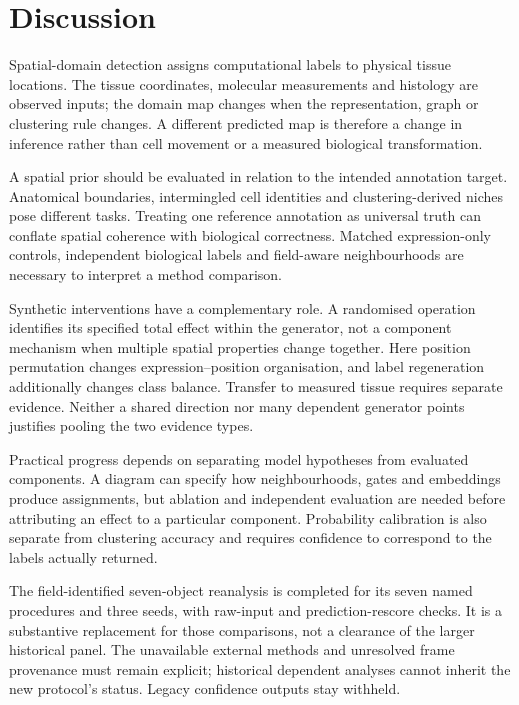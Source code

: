 \documentclass[11pt]{article}
\begin{document}
\section{Discussion}
Spatial-domain detection assigns computational labels to physical tissue locations. The tissue coordinates, molecular measurements and histology are observed inputs; the domain map changes when the representation, graph or clustering rule changes. A different predicted map is therefore a change in inference rather than cell movement or a measured biological transformation.

A spatial prior should be evaluated in relation to the intended annotation target. Anatomical boundaries, intermingled cell identities and clustering-derived niches pose different tasks. Treating one reference annotation as universal truth can conflate spatial coherence with biological correctness. Matched expression-only controls, independent biological labels and field-aware neighbourhoods are necessary to interpret a method comparison.

Synthetic interventions have a complementary role. A randomised operation identifies its specified total effect within the generator, not a component mechanism when multiple spatial properties change together. Here position permutation changes expression--position organisation, and label regeneration additionally changes class balance. Transfer to measured tissue requires separate evidence. Neither a shared direction nor many dependent generator points justifies pooling the two evidence types.

Practical progress depends on separating model hypotheses from evaluated components. A diagram can specify how neighbourhoods, gates and embeddings produce assignments, but ablation and independent evaluation are needed before attributing an effect to a particular component. Probability calibration is also separate from clustering accuracy and requires confidence to correspond to the labels actually returned.

\noindent
The field-identified seven-object reanalysis is completed for its seven named procedures and three seeds, with raw-input and prediction-rescore checks. It is a substantive replacement for those comparisons, not a clearance of the larger historical panel. The unavailable external methods and unresolved frame provenance must remain explicit; historical dependent analyses cannot inherit the new protocol's status. Legacy confidence outputs stay withheld.
\end{document}
